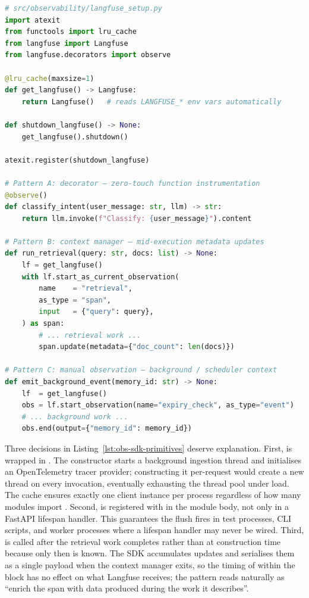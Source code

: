 \begin{lstlisting}[language=Python,
  caption={Singleton client factory; three observation patterns},
  label={lst:obs-sdk-primitives}]
# src/observability/langfuse_setup.py
import atexit
from functools import lru_cache
from langfuse import Langfuse
from langfuse.decorators import observe

@lru_cache(maxsize=1)
def get_langfuse() -> Langfuse:
    return Langfuse()   # reads LANGFUSE_* env vars automatically

def shutdown_langfuse() -> None:
    get_langfuse().shutdown()

atexit.register(shutdown_langfuse)

# Pattern A: decorator — zero-touch function instrumentation
@observe()
def classify_intent(user_message: str, llm) -> str:
    return llm.invoke(f"Classify: {user_message}").content

# Pattern B: context manager — mid-execution metadata updates
def run_retrieval(query: str, docs: list) -> None:
    lf = get_langfuse()
    with lf.start_as_current_observation(
        name    = "retrieval",
        as_type = "span",
        input   = {"query": query},
    ) as span:
        # ... retrieval work ...
        span.update(metadata={"doc_count": len(docs)})

# Pattern C: manual observation — background / scheduler context
def emit_background_event(memory_id: str) -> None:
    lf  = get_langfuse()
    obs = lf.start_observation(name="expiry_check", as_type="event")
    # ... background work ...
    obs.end(output={"memory_id": memory_id})
\end{lstlisting}

Three decisions in Listing~\ref{lst:obs-sdk-primitives} deserve
explanation. First,  is wrapped in
. The  constructor starts a
background ingestion thread and initialises an OpenTelemetry tracer
provider; constructing it per-request would create a new thread on every
invocation, eventually exhausting the thread pool under load. The cache
ensures exactly one client instance per process regardless of how many
modules import . Second, 
is registered with  in the module body, not only in a
FastAPI lifespan handler. This guarantees the flush fires in test
processes, CLI scripts, and worker processes where a lifespan handler
may never be wired. Third,  is called after the
retrieval work completes rather than at construction time because only
then is  known. The SDK accumulates updates and
serialises them as a single payload when the context manager exits, so
the timing of  within the block has no effect on what
Langfuse receives; the pattern reads naturally as ``enrich the span
with data produced during the work it describes''.

